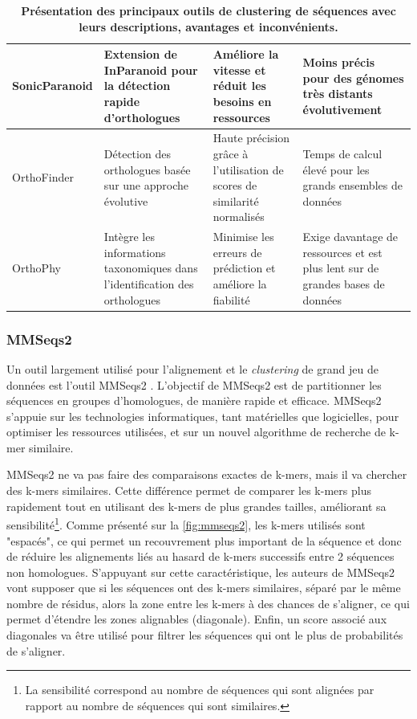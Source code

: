 \begin{table}[htbp]
\begin{tabular}{|p{}|p{}|p{}|p{}|}
\hline
SonicParanoid \cite{cosentino_sonicparanoid_2019} & Extension de InParanoid pour la détection rapide d'orthologues & Améliore la vitesse et réduit les besoins en ressources & Moins précis pour des génomes très distants évolutivement \\
\hline
OrthoFinder \cite{emms_orthofinder_2019} & Détection des orthologues basée sur une approche évolutive & Haute précision grâce à l'utilisation de scores de similarité normalisés & Temps de calcul élevé pour les grands ensembles de données \\
\hline
OrthoPhy \cite{watanabe_orthophy_2023} & Intègre les informations taxonomiques dans l'identification des orthologues & Minimise les erreurs de prédiction et améliore la fiabilité & Exige davantage de ressources et est plus lent sur de grandes bases de données \\
\hline
\end{tabular}
\caption[Outils de clustering des séquences]{\textbf{Présentation des principaux  outils de clustering de séquences avec leurs descriptions, avantages et inconvénients.}}
\label{tab:clustering}
\end{table}

\newpage
\subsubsection{MMSeqs2}

Un outil largement utilisé pour l'alignement et le \textit{clustering} de grand jeu de données est l'outil MMSeqs2 \cite{steinegger_mmseqs2_2017}. L'objectif de MMSeqs2 est de partitionner les séquences en groupes d'homologues, de manière rapide et efficace. MMSeqs2 s'appuie sur les technologies informatiques, tant matérielles que logicielles, pour optimiser les ressources utilisées, et sur un nouvel algorithme de recherche de k-mer similaire. 

MMSeqs2 ne va pas faire des comparaisons exactes de k-mers, mais il va chercher des k-mers similaires. Cette différence permet de comparer les k-mers plus rapidement tout en utilisant des k-mers de plus grandes tailles, améliorant sa sensibilité\footnote{La sensibilité correspond au nombre de séquences qui sont alignées par rapport au nombre de séquences qui sont similaires.}. Comme présenté sur la \autoref{fig:mmseqs2}, les k-mers utilisés sont "espacés", ce qui permet un recouvrement plus important de la séquence et donc de réduire les alignements liés au hasard de k-mers successifs entre 2 séquences non homologues. S'appuyant sur cette caractéristique, les auteurs de MMSeqs2 vont supposer que si les séquences ont des k-mers similaires, séparé par le même nombre de résidus, alors la zone entre les k-mers à des chances de s'aligner, ce qui permet d'étendre les zones alignables (diagonale). Enfin, un score associé aux diagonales va être utilisé pour filtrer les séquences qui ont le plus de probabilités de s'aligner.

